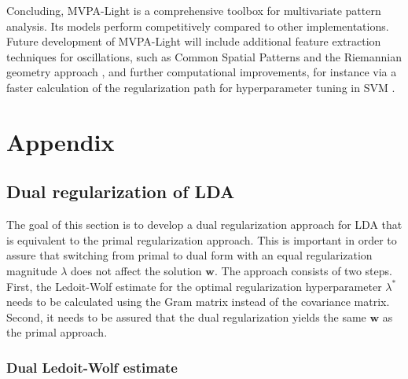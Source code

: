 \documentclass[utf8]{frontiersSCNS} %
\newcommand{\w}{\mathbf{w}}
\newcommand{\ttt}[1]{\texttt{#1}}
\begin{document}

Concluding, MVPA-Light is a comprehensive toolbox for multivariate pattern analysis. Its models perform competitively compared to other implementations. Future development of MVPA-Light will include additional feature extraction techniques for oscillations, such as Common Spatial Patterns \citep{Blankertz2008a} and the Riemannian geometry approach \citep{Barachant2013}, and further computational improvements, for instance via a faster calculation of the regularization path for hyperparameter tuning in SVM \citep{Hastie2004TheMachine}.

\section{Appendix}

\subsection{Dual regularization of LDA}\label{app:dualLDA}

The goal of this section is to develop a dual regularization approach for LDA that is equivalent to the primal regularization approach. This is important in order to assure that switching from primal to dual form with an equal regularization magnitude $\lambda$ does not affect the solution $\w$. The approach consists of two steps. First, the Ledoit-Wolf estimate for the optimal regularization hyperparameter $\lambda^*$ needs to be calculated using the Gram matrix instead of the covariance matrix. Second, it needs to be assured that the dual regularization yields the same $\w$ as the primal approach.

\subsubsection{Dual Ledoit-Wolf estimate}
\end{document}
